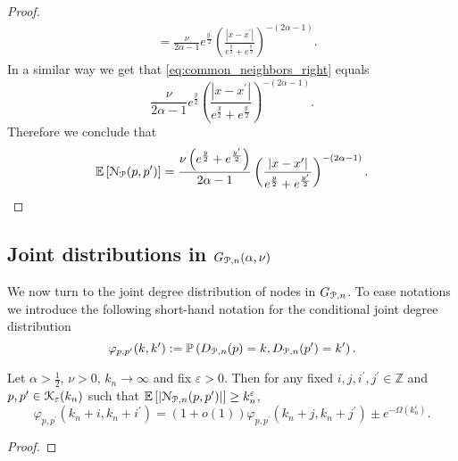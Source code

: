 \begin{appendices}
\begin{proof}
\begin{align*}
    &= \frac{\nu}{2\alpha - 1} e^{\frac{y^\prime}{2}}
    	\left(\frac{|x - x^\prime|}{e^{\frac{y}{2}} + e^{\frac{y^\prime}{2}}}\right)^{-(2\alpha - 1)}.
\end{align*}
In a similar way we get that \eqref{eq:common_neighbors_right} equals
\[
	\frac{\nu}{2\alpha - 1} e^{\frac{y}{2}}
    	\left(\frac{|x - x^\prime|}{e^{\frac{y}{2}} + e^{\frac{y^\prime}{2}}}\right)^{-(2\alpha - 1)}.
\]
Therefore we conclude that
\[
	\mathbb{E}\left[{\mathcal N}_{{\mathcal P}}(p,p^\prime)\right] = \frac{\nu\left(e^{\frac{y}{2}} + e^{\frac{y^\prime}{2}}\right)}{2\alpha - 1}
    	\left(\frac{|x - x^\prime|}{e^{\frac{y}{2}} + e^{\frac{y^\prime}{2}}}\right)^{-(2\alpha - 1)}.
\]
\end{proof}

\subsection{Joint distributions in $G_{{\mathcal P},n}(\alpha,\nu)$}

We now turn to the joint degree distribution of nodes in $G_{{\mathcal P},n}$. To ease notations we introduce the following short-hand notation for the conditional joint degree distribution
\[
	\varphi_{p,p^\prime}(k,k^\prime) 
	:= \mathbb{P}\left(D_{{\mathcal P},n}(p) = k, D_{{\mathcal P},n}(p^\prime) = k^\prime\right).
\]

\begin{lemma}\label{lem:joint_degree_distribution_shift}
Let $\alpha > \frac{1}{2}$, $\nu > 0$, $k_n \to \infty$ and fix $\varepsilon > 0$. Then for any fixed $i, j, i^\prime, j^\prime \in \mathbb{Z}$ and $p, p^\prime \in {\mathcal K}_{\varepsilon}(k_n)$ such that $\mathbb{E}\left[\left|{\mathcal N}_{{\mathcal P},n}(p,p^\prime)\right|\right] \ge k_n^{\varepsilon}$,
\[
	\varphi_{p,p^\prime}(k_n + i,k_n + i^\prime) 
	= (1 + o(1))\varphi_{p,p^\prime}(k_n + j,k_n + j^\prime)  \pm e^{-\Omega(k_n^\varepsilon)}.
\]
\end{lemma}

\begin{proof}


\end{proof}
\end{appendices}
